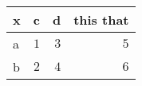 \begin{table}[!tbp]
\begin{center}
\begin{tabular}{lrrr}
\hline\hline
\multicolumn{1}{l}{x}&\multicolumn{1}{c}{c}&\multicolumn{1}{c}{d}&\multicolumn{1}{c}{this that}\tabularnewline
\hline
a&$1$&$3$&$5$\tabularnewline
b&$2$&$4$&$6$\tabularnewline
\hline
\end{tabular}\end{center}

\end{table}
